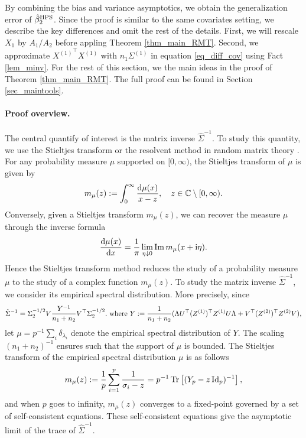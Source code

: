 By combining the bias and variance asymptotics, we obtain the generalization error of $\hat{\beta}_2^{\textup{HPS}}$.
Since the proof is similar to the same covariates setting, we describe the key differences and omit the rest of the details.
First, we will rescale $X_1$ by $A_1 / A_2$ before appling Theorem \ref{thm_main_RMT}.
Second, we approximate ${X^{(1)}}^{\top}X^{(1)}$ with $n_1 \Sigma^{(1)}$ in equation \eqref{eq_diff_cov} using Fact \ref{lem_minv}.
For the rest of this section, we the main ideas in the proof of Theorem \ref{thm_main_RMT}.
The full proof can be found in Section \ref{sec_maintools}.

\paragraph{Proof overview.} The central quantify of interest is the matrix inverse $\hat{\Sigma}^{-1}$.
To study this quantity, we use the Stieltjes transform or the resolvent method in random matrix theory \cite{bai2009spectral,tao2012topics,erdos2017dynamical}.
For any probability measure $\mu$ supported on $[0,\infty)$, the Stieltjes transform of $\mu$ is given by
$$m_\mu(z):= \int_0^\infty \frac{\mathrm{d}\mu(x)}{x-z},\quad z\in \mathbb{C}\setminus [0,\infty).$$
Conversely, given a Stieltjes transform $m_{\mu}(z)$, we can recover the measure $\mu$ through the inverse formula 
$$ \frac{\mathrm{d} \mu(x)}{\mathrm{d} x} = \frac{1}{\pi}\lim_{\eta \downarrow 0}\operatorname{Im} m_{\mu}(x+\mathrm{i} \eta).$$
Hence the Stieltjes transform method reduces the study of a probability measure $\mu$ to the study of a complex function $m_\mu(z)$.
To study the matrix inverse $\hat{\Sigma}^{-1}$, we consider its empirical spectral distribution.
More precisely, since
\begin{align}\label{eigen2extra}
	\hat{\Sigma}^{-1}= \Sigma_2^{-1/2}V \frac{Y^{-1}}{n_1 + n_2} V^\top\Sigma_2^{-1/2}. \text{ where } Y := \frac{1}{n_1 + n_2}(\Lambda U^\top (Z^{(1)})^\top Z^{(1)} U\Lambda  + V^\top (Z^{(2)})^\top Z^{(2)}V),
\end{align}
let $\mu=p^{-1}\sum_{i} \delta_{\lambda_i}$ denote the empirical spectral distribution of $Y$.
The scaling $(n_1+n_2)^{-1}$ ensures such that the support of $\mu$ is bounded.
The Stieltjes transform of the empirical spectral distribution $\mu$ is as follows
 \[ m_{\mu}(z) := \frac{1}{p}\sum_{i=1}^p \frac{1}{\sigma_i - z}= p^{-1}\operatorname{Tr}\left[ (Y_p-z\operatorname{Id}_p)^{-1}\right], \]
and when $p$ goes to infinity, $m_{\mu}(z)$ converges to a fixed-point governed by a set of self-consistent equations.
These self-consistent equations give the asymptotic limit of the trace of $\hat{\Sigma}^{-1}$.

